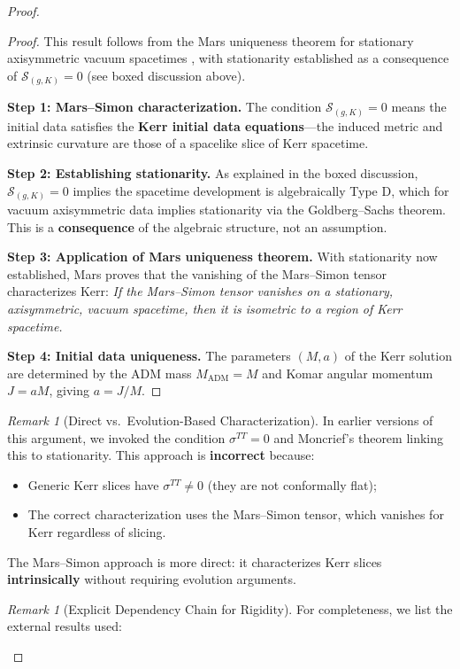 \documentclass[12pt]{article}
\theoremstyle{plain}
\theoremstyle{definition}
\theoremstyle{remark}
\newtheorem{remark}[theorem]{Remark}
\newcommand{\ADM}{\mathrm{ADM}}
\begin{document}
\begin{proof}
\begin{proof}
This result follows from the Mars uniqueness theorem for stationary axisymmetric vacuum spacetimes \cite{mars1999, mars2009}, with stationarity established as a consequence of $\mathcal{S}_{(g,K)} = 0$ (see boxed discussion above).

\textbf{Step 1: Mars--Simon characterization.} 
The condition $\mathcal{S}_{(g,K)} = 0$ means the initial data satisfies the \textbf{Kerr initial data equations}---the induced metric and extrinsic curvature are those of a spacelike slice of Kerr spacetime.

\textbf{Step 2: Establishing stationarity.}
As explained in the boxed discussion, $\mathcal{S}_{(g,K)} = 0$ implies the spacetime development is algebraically Type D, which for vacuum axisymmetric data implies stationarity via the Goldberg--Sachs theorem. This is a \textbf{consequence} of the algebraic structure, not an assumption.

\textbf{Step 3: Application of Mars uniqueness theorem.}
With stationarity now established, Mars \cite{mars1999, mars2009} proves that the vanishing of the Mars--Simon tensor characterizes Kerr: \textit{If the Mars--Simon tensor vanishes on a stationary, axisymmetric, vacuum spacetime, then it is isometric to a region of Kerr spacetime.}

\textbf{Step 4: Initial data uniqueness.}
The parameters $(M, a)$ of the Kerr solution are determined by the ADM mass $M_{\ADM} = M$ and Komar angular momentum $J = aM$, giving $a = J/M$.
\end{proof}

\begin{remark}[Direct vs.\ Evolution-Based Characterization]
In earlier versions of this argument, we invoked the condition $\sigma^{TT} = 0$ and Moncrief's theorem linking this to stationarity. This approach is \textbf{incorrect} because:
\begin{itemize}
    \item Generic Kerr slices have $\sigma^{TT} \neq 0$ (they are not conformally flat);
    \item The correct characterization uses the Mars--Simon tensor, which vanishes for Kerr regardless of slicing.
\end{itemize}
The Mars--Simon approach is more direct: it characterizes Kerr slices \textbf{intrinsically} without requiring evolution arguments.
\end{remark}

\begin{remark}[Explicit Dependency Chain for Rigidity]\label{rem:rigidity-dependencies}
For completeness, we list the external results used:


\end{remark}
\end{proof}
\end{document}

